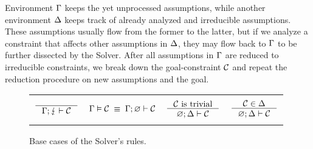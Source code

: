 \documentclass[english, mgr]{iithesis}
\newcommand{\solverRule}{\vdash}
\begin{document}
Environment $\Gamma$ keeps the yet unprocessed assumptions,
while another environment $\Delta$ keeps track of already analyzed and irreducible assumptions.
These assumptions usually flow from the former to the latter, but if we analyze
a constraint that affects other assumptions in $\Delta$,
they may flow back to $\Gamma$ to be further dissected by the Solver.
After all assumptions in $\Gamma$ are reduced to irreducible constraints,
we break down the goal-constraint $\mathcal{C}$ and repeat the reduction procedure on
new assumptions and the goal.
\begin{figure}[htpb]
  \centering
    \begin{tabularx}{\textwidth}{|CCCC|}
    \hline & & \\ $
      \inference{
      }{
        \cEnv ; \lightning \solverRule \sconstr
      }
      $ & $
        \cEnv \vDash \sconstr \;\equiv\;
        \cEnv ; \emptyenv \solverRule \sconstr
      $ & $
      \inference{
        \sconstr \text{ is trivial}
      }{
        \emptyenv ; \icEnv \solverRule \sconstr
      } $ & $
      \inference{
        \sconstr \in \icEnv
      }{
        \emptyenv ; \icEnv \solverRule \sconstr
      } $ \\ & & \\ \hline
    \end{tabularx}
  \caption{Base cases of the Solver's rules.}
  \label{fig:solver-base}
\end{figure}
\end{document}
